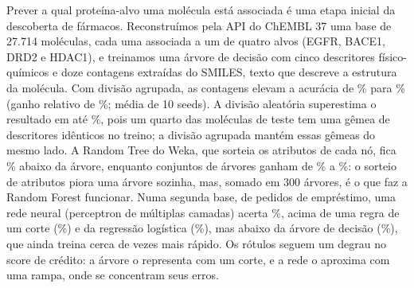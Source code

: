 \documentclass[12pt]{article}
\begin{document}
\begin{resumo}
  Prever a qual proteína-alvo uma molécula está associada é uma etapa inicial da descoberta de
  fármacos. Reconstruímos pela API do ChEMBL 37 uma base de 27.714 moléculas, cada uma associada a
  um de quatro alvos (EGFR, BACE1, DRD2 e HDAC1), e treinamos uma árvore de decisão com cinco
  descritores físico-químicos e doze contagens extraídas do SMILES, texto que descreve a estrutura
  da molécula. Com divisão agrupada, as contagens elevam a acurácia de \accGrupDesc\% para
  \accGrupAmbos\% (ganho relativo de \ganhoAmbos\%; média de 10 seeds). A divisão aleatória
  superestima o resultado em até \gapMax\%, pois um quarto das moléculas de teste tem uma gêmea de
  descritores idênticos no treino; a divisão agrupada mantém essas gêmeas do mesmo lado. A Random Tree
  do Weka, que sorteia os atributos de cada nó, fica \relRT\% abaixo da árvore, enquanto conjuntos de
  árvores ganham de \relHGB\% a \relGBaj\%: o sorteio de atributos piora uma árvore sozinha, mas,
  somado em 300 árvores, é o que faz a Random Forest funcionar. Numa segunda base, de \rnLinhas{} pedidos
  de empréstimo, uma rede neural (perceptron de múltiplas camadas) acerta \rnAccRede\%, acima de uma regra de
  um corte (\rnAccRegra\%) e da regressão logística (\rnAccLog\%), mas abaixo da árvore de decisão
  (\rnAccArv\%), que ainda treina cerca de \rnRazaoTreino{} vezes mais rápido. Os rótulos seguem um degrau no
  score de crédito: a árvore o representa com um corte, e a rede o aproxima com uma rampa, onde se concentram
  seus erros.
\end{resumo}













\end{document}
